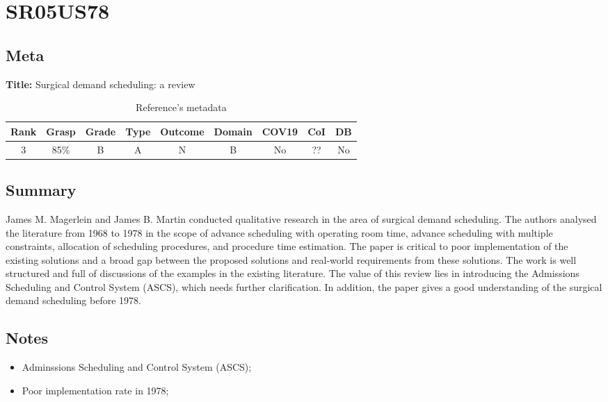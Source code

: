 \section{ SR05US78 }


\subsection{Meta}

    \textbf{Title:}
    Surgical demand scheduling: a review

    \begin{table}[H]
        \centering
        \begin{tabular}{|c|c|c|c|c|c|c|c|c|}
            \hline
                \textbf{Rank} & \textbf{Grasp} & \textbf{Grade} & \textbf{Type} & \textbf{Outcome} & \textbf{Domain} & \textbf{COV19} & \textbf{CoI} & \textbf{DB} \\
            \hline
                3 & 85\% & B & A & N & B & No & ?? & No \\
            \hline
        \end{tabular}
        \caption{Reference's metadata}
        \label{tab:SR05US78}
    \end{table}

\subsection{Summary}
    James M. Magerlein and James B. Martin \cite{x235} conducted qualitative research in the area of surgical demand scheduling. The authors analysed the literature from 1968 to 1978 in the scope of advance scheduling with operating room time, advance scheduling with multiple constraints, allocation of scheduling procedures, and procedure time estimation. The paper is critical to poor implementation of the existing solutions and a broad gap between the proposed solutions and real-world requirements from these solutions. The work is well structured and full of discussions of the examples in the existing literature. The value of this review lies in introducing the Admissions Scheduling and Control System (ASCS), which needs further clarification. In addition, the paper gives a good understanding of the surgical demand scheduling before 1978.

\subsection{Notes}
    \begin{itemize}
        \item Adminssions Scheduling and Control System (ASCS);
        \item Poor implementation rate in 1978;
    \end{itemize}



